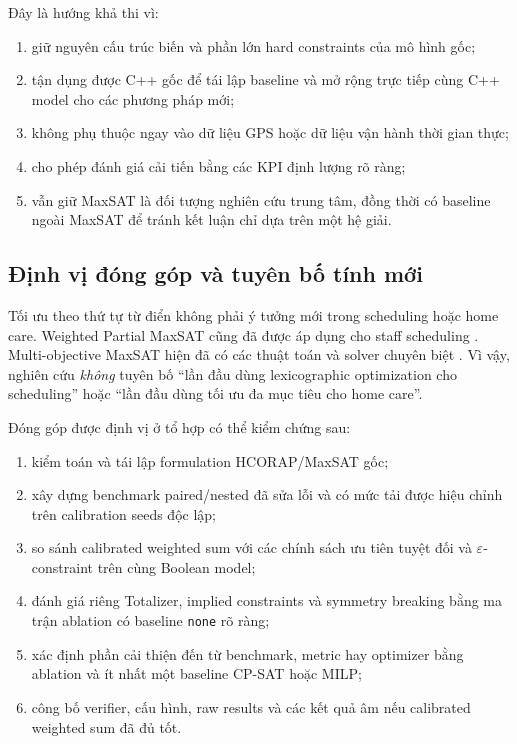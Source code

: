 \documentclass[12pt,a4paper]{article}
\begin{document}
Đây là hướng khả thi vì:
\begin{enumerate}
  \item giữ nguyên cấu trúc biến và phần lớn hard constraints của mô hình gốc;
  \item tận dụng được C++ gốc để tái lập baseline và mở rộng trực tiếp cùng
        C++ model cho các phương pháp mới;
  \item không phụ thuộc ngay vào dữ liệu GPS hoặc dữ liệu vận hành thời gian thực;
  \item cho phép đánh giá cải tiến bằng các KPI định lượng rõ ràng;
  \item vẫn giữ MaxSAT là đối tượng nghiên cứu trung tâm, đồng thời có baseline
        ngoài MaxSAT để tránh kết luận chỉ dựa trên một hệ giải.
\end{enumerate}

\subsection{Định vị đóng góp và tuyên bố tính mới}

Tối ưu theo thứ tự từ điển không phải ý tưởng mới trong scheduling hoặc home
care. Weighted Partial MaxSAT cũng đã được áp dụng cho staff scheduling
\cite{demirovic2019,mosquera2019,bodvarsdottir2025}. Multi-objective MaxSAT hiện
đã có các thuật toán và solver chuyên biệt \cite{jabs2025}. Vì vậy, nghiên cứu
\emph{không} tuyên bố ``lần đầu dùng lexicographic optimization cho scheduling''
hoặc ``lần đầu dùng tối ưu đa mục tiêu cho home care''.

Đóng góp được định vị ở tổ hợp có thể kiểm chứng sau:
\begin{enumerate}
  \item kiểm toán và tái lập formulation HCORAP/MaxSAT gốc;
  \item xây dựng benchmark paired/nested đã sửa lỗi và có mức tải được hiệu
        chỉnh trên calibration seeds độc lập;
  \item so sánh calibrated weighted sum với các chính sách ưu tiên tuyệt đối và
        $\varepsilon$-constraint trên cùng Boolean model;
  \item đánh giá riêng Totalizer, implied constraints và symmetry breaking bằng
        ma trận ablation có baseline \texttt{none} rõ ràng;
  \item xác định phần cải thiện đến từ benchmark, metric hay optimizer bằng
        ablation và ít nhất một baseline CP-SAT hoặc MILP;
  \item công bố verifier, cấu hình, raw results và các kết quả âm nếu calibrated
        weighted sum đã đủ tốt.
\end{enumerate}
\end{document}
